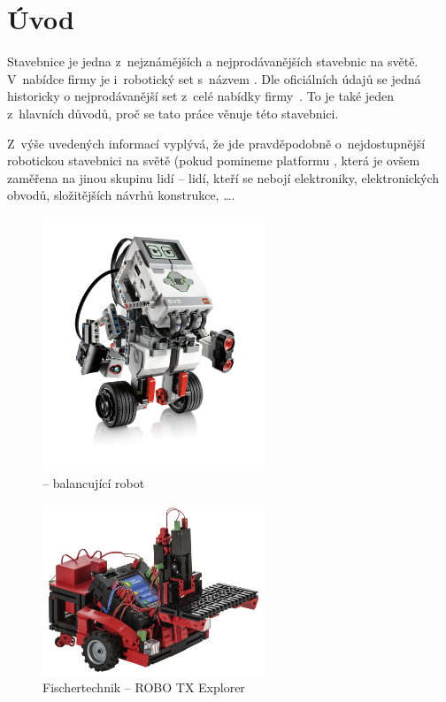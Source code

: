 \chapter{Úvod}

Stavebnice \lego{ }je jedna z~nejznámějších a nejprodávanějších stavebnic na světě. 
V~nabídce firmy \lego{ }je i~robotický set s~názvem \legoM. 
Dle oficiálních údajů se jedná historicky o nejprodávanější set z~celé nabídky firmy~\cite{legoGizmodo_SalesStatistic}. 
To je také jeden z~hlavních důvodů, proč se tato práce věnuje této stavebnici. 

Z~výše uvedených informací vyplývá, že jde pravděpodobně o~nejdostupnější robotickou stavebnici na světě (pokud pomineme platformu \arduino, která je ovšem zaměřena na jinou skupinu lidí -- lidí, kteří se nebojí elektroniky, elektronických obvodů, složitějších návrhů konstrukce, \dots{}.

\begin{figure}[h]
	\centering
	\includegraphics[width=250px]{images/lego-mindstorms-ev3_Robotics-for-Kids.png}
	\caption[\legoEV{ }-- samobalancující robot]{\legoEV{ }-- balancující robot\protect\footnotemark}
	\label{fig:lego-mindstorms-ev3_Robotics-for-Kids}
\end{figure}



\begin{figure}[h]
	\centering
	\includegraphics[width=250px]{images/fischertechnik_ROBO-TX-Explorer_02.jpg}
	\caption[Fischertechnik -- ROBO TX Explorer]{Fischertechnik -- ROBO TX Explorer\protect\footnotemark}
	\label{fig:fischertechnik_ROBO-TX-Explorer}
\end{figure}

